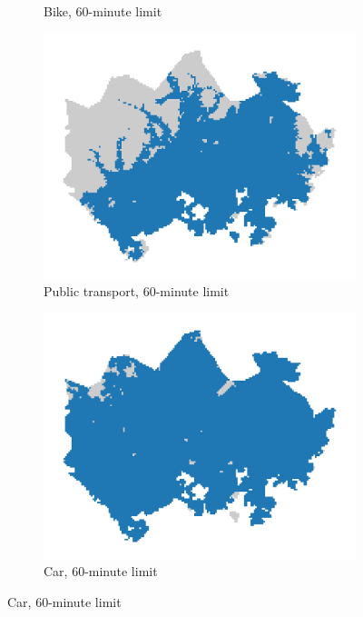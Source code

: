 \begin{figure}[H]
\begin{subfigure}[b]{0.5\textwidth}
		\caption{Bike, 60-minute limit}
		\label{fig:limit bike}
	\end{subfigure}%
	\hfill
	\begin{subfigure}[b]{0.5\textwidth}
		\includegraphics[width=\textwidth]{visual/figures/ttm/tt_limit_pt}
		\caption{Public transport, 60-minute limit}
		\label{fig:limit pt}
	\end{subfigure}%
	\hfill
	\begin{subfigure}[b]{0.5\textwidth}
		\includegraphics[width=\textwidth]{visual/figures/ttm/tt_limit_car}
		\caption{Car, 60-minute limit}
		\label{fig:limit car}
	\end{subfigure}%

\end{figure}
